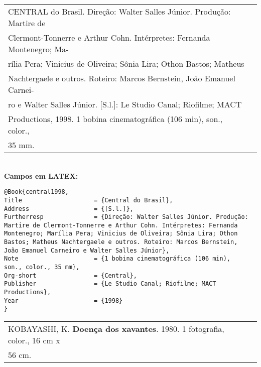 \begin{tabular}{|l|c|} \hline
	CENTRAL do Brasil. Direção: Walter Salles Júnior. Produção: Martire de \\
	Clermont-Tonnerre e Arthur Cohn. Intérpretes: Fernanda Montenegro; Ma-     \\
	rília Pera; Vinicius de Oliveira; Sônia Lira; Othon Bastos; Matheus       \\ 
	Nachtergaele e outros. Roteiro: Marcos Bernstein, João Emanuel Carnei-     \\
	ro e Walter Salles Júnior. [S.l.]: Le Studio Canal; Riofilme; MACT         \\
	Productions, 1998. 1 bobina cinematográfica (106 min), son., color.,       
	                                                                            \\35 mm. 
	                                                                            \\\hline
\end{tabular} \\
	
\textbf{Campos em LATEX:} 
	
\begingroup
\fontsize{10pt}{12pt}\selectfont
\begin{verbatim}
@Book{central1998,
Title                    = {Central do Brasil},
Address                  = {[S.l.]},
Furtherresp              = {Direção: Walter Salles Júnior. Produção: 
Martire de Clermont-Tonnerre e Arthur Cohn. Intérpretes: Fernanda 
Montenegro; Marília Pera; Vinicius de Oliveira; Sônia Lira; Othon 
Bastos; Matheus Nachtergaele e outros. Roteiro: Marcos Bernstein, 
João Emanuel Carneiro e Walter Salles Júnior},
Note                     = {1 bobina cinematográfica (106 min), 
son., color., 35 mm},
Org-short                = {Central},
Publisher                = {Le Studio Canal; Riofilme; MACT 
Productions},
Year                     = {1998}
}
\end{verbatim}
\endgroup
	
	
\begin{tabular}{|l|c|} \hline
	KOBAYASHI, K. \textbf{Doença dos xavantes}. 1980. 1 fotografia, color., 16 cm x \\
	56 cm.                                                                           
	                                                                                 \\\hline
\end{tabular} \\
	
